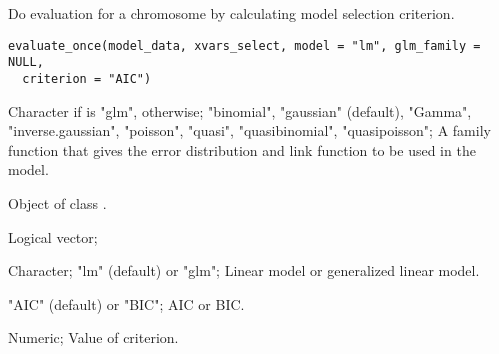 %
\begin{Description}\relax
Do evaluation for a chromosome by calculating model selection criterion.
\end{Description}
%
\begin{Usage}
\begin{verbatim}
evaluate_once(model_data, xvars_select, model = "lm", glm_family = NULL,
  criterion = "AIC")
\end{verbatim}
\end{Usage}
%
\begin{Arguments}
\begin{ldescription}
\item[\code{glm\_family}] Character if  is "glm",  otherwise;
"binomial", "gaussian" (default), "Gamma", "inverse.gaussian", "poisson", "quasi",
"quasibinomial", "quasipoisson"; A family function that gives the error
distribution and link function to be used in the model.

\item[\code{model\_data;}] Object of class .

\item[\code{xvars\_select;}] Logical vector;

\item[\code{model;}] Character; "lm" (default) or "glm"; Linear model or generalized linear model.

\item[\code{criterion;}] "AIC" (default) or "BIC"; AIC or BIC.
\end{ldescription}
\end{Arguments}
%
\begin{Value}
Numeric; Value of criterion.
\end{Value}
